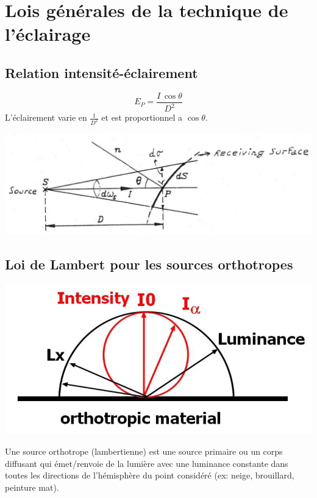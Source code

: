 \documentclass[11pt]{report}
\begin{document}








\section{Lois générales de la technique de l'éclairage}
\subsection{Relation intensité-éclairement}
\begin{minipage}{0.4\linewidth}
$$E_P = \frac{I \, \cos \theta}{D^2}$$
L'éclairement varie en $\displaystyle \frac{1}{D^2}$ et est proportionnel a $\cos \theta$.
\end{minipage}
\begin{minipage}{0.6\linewidth}
\centering
\includegraphics[width=0.9\linewidth]{inversedist}
\end{minipage}


\subsection{Loi de Lambert pour les sources orthotropes}
\begin{minipage}{0.4\linewidth}
\centering
\includegraphics[scale=0.3]{lambert}
\end{minipage}
\begin{minipage}{0.6\linewidth}
Une source orthotrope (lambertienne) est une source primaire ou un corps diffusant qui émet/renvoie de la lumière avec une luminance constante dans toutes les directions de l'hémisphère du point considéré (ex: neige, brouillard, peinture mat).
\end{minipage}
\end{document}
